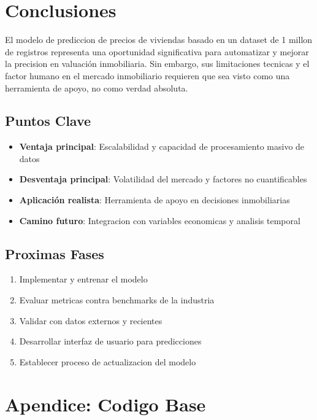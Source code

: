 \documentclass[12pt,a4paper]{article}
\begin{document}
\section{Conclusiones}

El modelo de prediccion de precios de viviendas basado en un dataset de 1 millon de registros representa una oportunidad significativa para automatizar y mejorar la precision en valuación inmobiliaria. Sin embargo, sus limitaciones tecnicas y el factor humano en el mercado inmobiliario requieren que sea visto como una herramienta de apoyo, no como verdad absoluta.

\subsection{Puntos Clave}
\begin{itemize}
    \item \textbf{Ventaja principal}: Escalabilidad y capacidad de procesamiento masivo de datos
    \item \textbf{Desventaja principal}: Volatilidad del mercado y factores no cuantificables
    \item \textbf{Aplicación realista}: Herramienta de apoyo en decisiones inmobiliarias
    \item \textbf{Camino futuro}: Integracion con variables economicas y analisis temporal
\end{itemize}

\subsection{Proximas Fases}
\begin{enumerate}
    \item Implementar y entrenar el modelo
    \item Evaluar metricas contra benchmarks de la industria
    \item Validar con datos externos y recientes
    \item Desarrollar interfaz de usuario para predicciones
    \item Establecer proceso de actualizacion del modelo
\end{enumerate}

\section{Apendice: Codigo Base}
\end{document}
